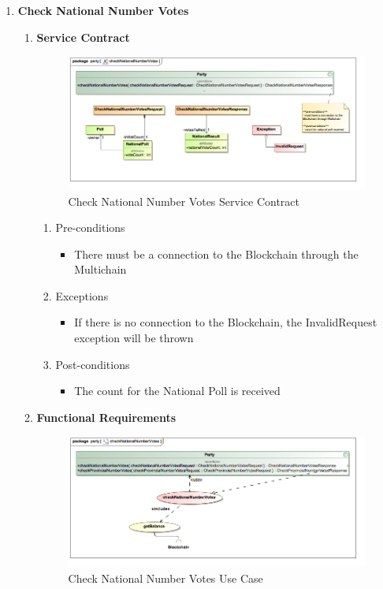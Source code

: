 \begin{enumerate}
	\item \textbf{Check National Number Votes}
		\begin{enumerate}
			\item \textbf{Service Contract}
				\begin{figure}[H]
					\centering
					\includegraphics[width=0.75\linewidth]{../Images/Party/ServiceContracts/CheckNationalNumberVotes_ServiceContract.png}
					\caption{Check National Number Votes Service Contract}
				\end{figure}
				
				\begin{enumerate}
					\item Pre-conditions
					\begin{itemize}
						\item There must be a connection to the Blockchain through the Multichain
					\end{itemize}
					
					\item Exceptions
					\begin{itemize}
						\item If there is no connection to the Blockchain, the InvalidRequest exception will be thrown
					\end{itemize}
					
					\item Post-conditions
					\begin{itemize}
						\item The count for the National Poll is received
					\end{itemize}
				\end{enumerate}
			
			\item \textbf{Functional Requirements}
				\begin{figure}[H]
					\centering
					\includegraphics[width=0.75\linewidth]{../Images/Party/UseCases/CheckNationalNumberVotes_UseCase.png}
					\caption{Check National Number Votes Use Case}
				\end{figure}
				

\end{enumerate}
\end{enumerate}
